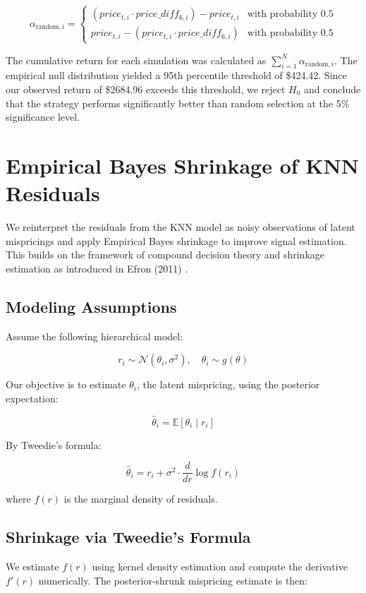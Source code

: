 \documentclass{article}
\begin{document}
\[
\alpha_{\text{random},i} = \begin{cases}
(price_{t,i} \cdot price\_diff_{6,i}) - price_{t,i} & \text{with probability } 0.5 \\
price_{t,i} - (price_{t,i} \cdot price\_diff_{6,i}) & \text{with probability } 0.5
\end{cases}
\]

The cumulative return for each simulation was calculated as $\sum_{i=1}^{N} \alpha_{\text{random},i}$. The empirical null distribution yielded a 95th percentile threshold of \$424.42. Since our observed return of \$2684.96 exceeds this threshold, we reject $H_0$ and conclude that the strategy performs significantly better than random selection at the 5\% significance level.


\section{Empirical Bayes Shrinkage of KNN Residuals}

We reinterpret the residuals from the KNN model as noisy observations of latent mispricings and apply Empirical Bayes shrinkage to improve signal estimation. This builds on the framework of compound decision theory and shrinkage estimation as introduced in Efron (2011) \cite{efron2011tweedie}.

\subsection{Modeling Assumptions}

Assume the following hierarchical model:

\[
r_i \sim \mathcal{N}(\theta_i, \sigma^2), \quad \theta_i \sim g(\theta)
\]

Our objective is to estimate \( \theta_i \), the latent mispricing, using the posterior expectation:

\[
\hat{\theta}_i = \mathbb{E}[\theta_i \mid r_i]
\]

By Tweedie's formula:

\[
\hat{\theta}_i = r_i + \sigma^2 \cdot \frac{d}{dr} \log f(r_i)
\]

where \( f(r) \) is the marginal density of residuals.

\subsection{Shrinkage via Tweedie's Formula}

We estimate \( f(r) \) using kernel density estimation and compute the derivative \( f'(r) \) numerically. The posterior-shrunk mispricing estimate is then:
\end{document}
